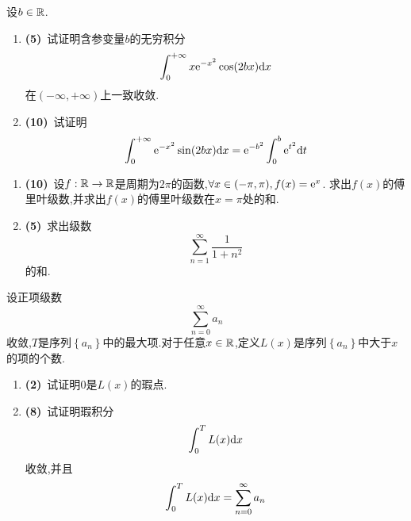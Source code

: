 \documentclass{ctexart}
\begin{document}
\begin{problem}[7.(15\songti{分})]
    设$b\in\mathbb{R}$.
    \begin{enumerate}[label=\tbf{(\arabic*)},topsep=0pt,parsep=0pt,itemsep=0pt,partopsep=0pt]
        \item \textbf{(5)}\ 试证明含参变量$b$的无穷积分
            \[\int_0^{+\infty}x\mathrm{e}^{-x^2}\cos(2bx)\mathrm{d} x\]
            在$(-\infty,+\infty)$上一致收敛.
        \item \textbf{(10)}\ 试证明
            \[\int_0^{+\infty}\mathrm{e}^{-x^2}\sin(2bx)\mathrm{d} x=\mathrm{e}^{-b^2}\int_0^b\mathrm{e}^{t^2}\mathrm{d} t\]
    \end{enumerate}

\end{problem}

\begin{problem}[8.(15\songti{分})]
    \begin{enumerate}[label=\tbf{(\arabic*)},topsep=0pt,parsep=0pt,itemsep=0pt,partopsep=0pt]
        \item \textbf{(10)}\ 设$f:\mathbb{R}\to\mathbb{R}$是周期为$2\pi$的函数,$\forall x\in(-\pi,\pi),f(x)=\mathrm{e}^x$.%
            求出$f(x)$的傅里叶级数,并求出$f(x)$的傅里叶级数在$x=\pi$处的和.
        \item \textbf{(5)}\ 求出级数
            \[\sum_{n=1}^{\infty}\dfrac{1}{1+n^2}\]
            的和.
    \end{enumerate}

\end{problem}

\begin{problem}[9.(10\songti{分})]
    设正项级数
    \[\sum_{n=0}^{\infty}a_n\]
    收敛,$T$是序列$\left\{a_n\right\}$中的最大项.对于任意$x\in\mathbb{R}$,定义$L(x)$是序列$\left\{a_n\right\}$中大于$x$的项的个数.
    \begin{enumerate}[label=\tbf{(\arabic*)},topsep=0pt,parsep=0pt,itemsep=0pt,partopsep=0pt]
        \item \textbf{(2)}\ 试证明$0$是$L(x)$的瑕点.
        \item \textbf{(8)}\ 试证明瑕积分
            \[\int_0^TL(x)\mathrm{d} x\]
            收敛,并且
            \[\int_0^TL(x)\mathrm{d} x=\sum_{n=0}^{\infty}a_n\]
    \end{enumerate}
    
\end{problem}
\end{document}
